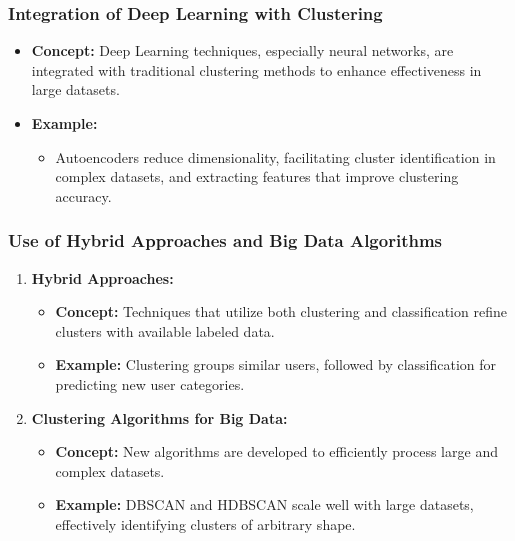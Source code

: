 \documentclass[aspectratio=169]{beamer}
\begin{document}
\begin{frame}[fragile]
    \frametitle{Integration of Deep Learning with Clustering}
    \begin{itemize}
        \item \textbf{Concept:} Deep Learning techniques, especially neural networks, are integrated with traditional clustering methods to enhance effectiveness in large datasets.
        \item \textbf{Example:} 
        \begin{itemize}
            \item Autoencoders reduce dimensionality, facilitating cluster identification in complex datasets, and extracting features that improve clustering accuracy.
        \end{itemize}
    \end{itemize}
\end{frame}

\begin{frame}[fragile]
    \frametitle{Use of Hybrid Approaches and Big Data Algorithms}
    \begin{enumerate}
        \item \textbf{Hybrid Approaches:}
        \begin{itemize}
            \item \textbf{Concept:} Techniques that utilize both clustering and classification refine clusters with available labeled data.
            \item \textbf{Example:} Clustering groups similar users, followed by classification for predicting new user categories.
        \end{itemize}
        
        \item \textbf{Clustering Algorithms for Big Data:}
        \begin{itemize}
            \item \textbf{Concept:} New algorithms are developed to efficiently process large and complex datasets.
            \item \textbf{Example:} DBSCAN and HDBSCAN scale well with large datasets, effectively identifying clusters of arbitrary shape.
        \end{itemize}
    \end{enumerate}
\end{frame}
\end{document}
